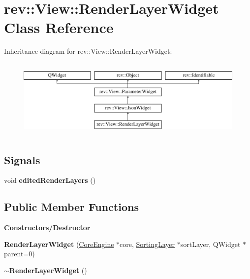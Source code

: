 \hypertarget{classrev_1_1_view_1_1_render_layer_widget}{}\section{rev\+::View\+::Render\+Layer\+Widget Class Reference}
\label{classrev_1_1_view_1_1_render_layer_widget}
Inheritance diagram for rev\+::View\+::Render\+Layer\+Widget\+:\begin{figure}[H]
\begin{center}
\leavevmode
\includegraphics[height=3.909250cm]{classrev_1_1_view_1_1_render_layer_widget}
\end{center}
\end{figure}
\subsection*{Signals}
\begin{DoxyCompactItemize}
\item 
\mbox{\label{classrev_1_1_view_1_1_render_layer_widget_aacdc2f692e1ef0b5e18fb05342fea618}} 
void {\bfseries edited\+Render\+Layers} ()
\end{DoxyCompactItemize}
\subsection*{Public Member Functions}
\begin{Indent}\textbf{ Constructors/\+Destructor}\par
\begin{DoxyCompactItemize}
\item 
\mbox{\label{classrev_1_1_view_1_1_render_layer_widget_a1f144a7f08cef4064861a864a3561e16}} 
{\bfseries Render\+Layer\+Widget} (\mbox{\hyperlink{classrev_1_1_core_engine}{Core\+Engine}} $\ast$core, \mbox{\hyperlink{structrev_1_1_sorting_layer}{Sorting\+Layer}} $\ast$sort\+Layer, Q\+Widget $\ast$parent=0)
\item 
\mbox{\label{classrev_1_1_view_1_1_render_layer_widget_af553aece8429b34300870e24c6ed0835}} 
{\bfseries $\sim$\+Render\+Layer\+Widget} ()
\end{DoxyCompactItemize}
\end{Indent}
